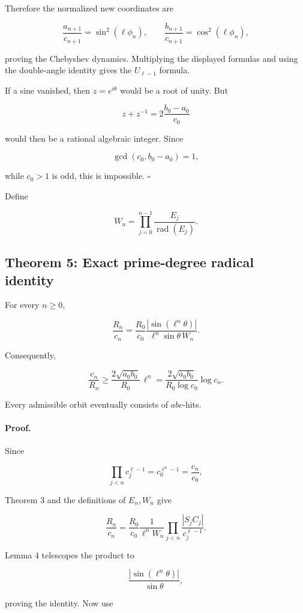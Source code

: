 \documentclass[11pt]{article}
\begin{document}
Therefore the normalized new coordinates are

\[
\frac{a_{n+1}}{c_{n+1}}
=
\sin^2(\ell\phi_n),
\qquad
\frac{b_{n+1}}{c_{n+1}}
=
\cos^2(\ell\phi_n),
\]

proving the Chebyshev dynamics. Multiplying the displayed formulas and
using the double-angle identity gives the \(U_{\ell-1}\) formula.

If a sine vanished, then \(z=e^{i\theta}\) would be a root of unity. But

\[
z+z^{-1}
=
2\frac{b_0-a_0}{c_0}
\]

would then be a rational algebraic integer. Since

\[
\gcd(c_0,b_0-a_0)=1,
\]

while \(c_0>1\) is odd, this is impossible. \(\square\)

Define

\[
W_n
=
\prod_{j=0}^{n-1}
\frac{E_j}{\operatorname{rad}(E_j)}.
\]

\subsection{Theorem 5: Exact prime-degree radical identity}

For every \(n\geq0\),

\[
\boxed{
\frac{R_n}{c_n}
=
\frac{R_0}{c_0}
\frac{|\sin(\ell^n\theta)|}
{\ell^n\sin\theta\,W_n}.
}
\]

Consequently,

\[
\frac{c_n}{R_n}
\geq
\frac{2\sqrt{a_0b_0}}{R_0}\,\ell^n
=
\frac{2\sqrt{a_0b_0}}
{R_0\log c_0}
\log c_n.
\]

Every admissible orbit eventually consists of \(abc\)-hits.

\paragraph{Proof.}

Since

\[
\prod_{j<n}c_j^{\ell-1}
=
c_0^{\ell^n-1}
=
\frac{c_n}{c_0},
\]

Theorem 3 and the definitions of \(E_n,W_n\) give

\[
\frac{R_n}{c_n}
=
\frac{R_0}{c_0}
\frac{1}{\ell^nW_n}
\prod_{j<n}
\frac{|S_jC_j|}{c_j^{\ell-1}}.
\]

Lemma 4 telescopes the product to

\[
\frac{|\sin(\ell^n\theta)|}{\sin\theta},
\]

proving the identity. Now use
\end{document}
